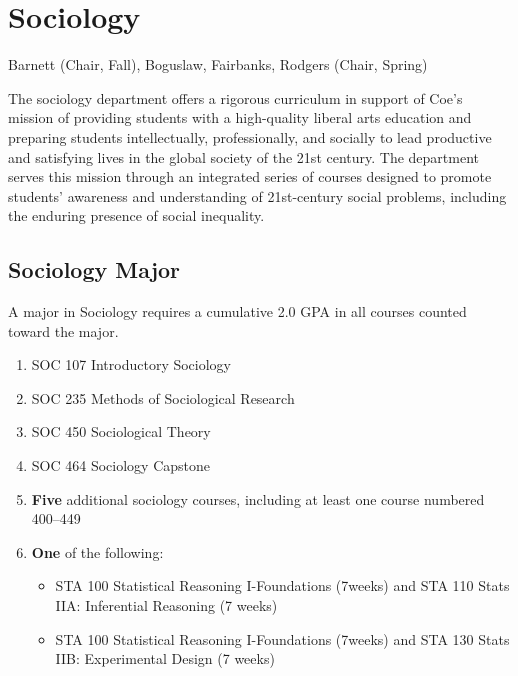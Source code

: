 \documentclass[
  letterpaper,
]{scrbook}
\providecommand{\tightlist}{%
  \setlength{\itemsep}{0pt}\setlength{\parskip}{0pt}}
\begin{document}
\section{Sociology}\label{sociology}

Barnett (Chair, Fall), Boguslaw, Fairbanks, Rodgers (Chair, Spring)

The sociology department offers a rigorous curriculum in support of
Coe's mission of providing students with a high-quality liberal arts
education and preparing students intellectually, professionally, and
socially to lead productive and satisfying lives in the global society
of the 21st century. The department serves this mission through an
integrated series of courses designed to promote students' awareness and
understanding of 21st-century social problems, including the enduring
presence of social inequality.

\subsection{Sociology Major}\label{sociology-major}

A major in Sociology requires a cumulative 2.0 GPA in all courses
counted toward the major.

\begin{enumerate}
\def\labelenumi{\arabic{enumi}.}
\tightlist
\item
  SOC 107 Introductory Sociology\\
\item
  SOC 235 Methods of Sociological Research\\
\item
  SOC 450 Sociological Theory\\
\item
  SOC 464 Sociology Capstone\\
\item
  \textbf{Five} additional sociology courses, including at least one
  course numbered 400--449\\
\item
  \textbf{One} of the following:

  \begin{itemize}
  \tightlist
  \item
    STA 100 Statistical Reasoning I-Foundations (7weeks) and STA 110
    Stats IIA: Inferential Reasoning (7 weeks)\\
  \item
    STA 100 Statistical Reasoning I-Foundations (7weeks) and STA 130
    Stats IIB: Experimental Design (7 weeks)
  \end{itemize}
\end{enumerate}
\end{document}
